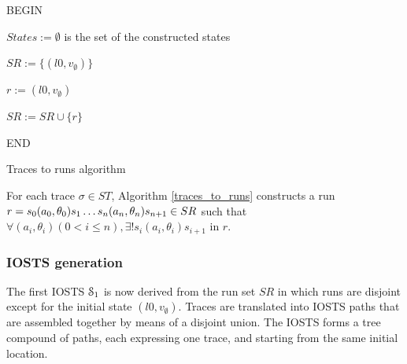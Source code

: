 \begin{algorithm}
 


BEGIN\;

$States:=\emptyset$ is the set of the constructed states\;

 {
$SR:= \{(l0,v_\emptyset)\}$}

 {
$r:= (l0,v_\emptyset)$\;


$SR:=SR \cup \{r\}$

}%

END\;

    \caption{Traces to runs algorithm}
    \label{traces_to_runs}
\end{algorithm}

\begin{proposition}
For each trace $\sigma \in ST$, Algorithm \ref{traces_to_runs}
constructs a run $r=s_0(a_0,\theta_0)s_1 \dots
\\s_n(a_n,\theta_n)s_{n+1} \in SR$ such that $\forall
(a_i,\theta_i) ( 0<i\leq n), \exists ! s_i(a_i,\theta_i)s_{i+1}$
in $r$.
\end{proposition}


\subsubsection{IOSTS generation}
\label{sec:iosts-gen}

The first IOSTS $\EuScript{S}_1$ is now derived from the run set
$SR$ in which runs are disjoint except for the initial state
$(l0,v_\emptyset)$. Traces are translated into IOSTS paths that
are assembled together by means of a disjoint union. The IOSTS
forms a tree compound of paths, each expressing one trace, and
starting from the same initial location.


